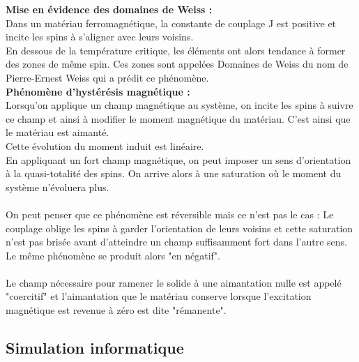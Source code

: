\textbf{Mise en évidence des domaines de Weiss :}\\
Dans un matériau ferromagnétique, la constante de couplage J est positive et incite les spins à s'aligner avec leurs voisins.\\
En dessous de la température critique, les éléments ont alors tendance à former des zones de même spin. Ces zones sont appelées Domaines de Weiss du nom de Pierre-Ernest Weiss qui a prédit ce phénomène.\\


\textbf{Phénomène d'hystérésis magnétique :}\\
Lorsqu'on applique un champ magnétique au système, on incite les spins à suivre ce champ et ainsi à modifier le moment magnétique du matériau. C'est ainsi que le matériau est aimanté.\\
Cette évolution du moment induit est linéaire.\\
En appliquant un fort champ magnétique, on peut imposer un sens d'orientation à la quasi-totalité des spins. On arrive alors à une saturation où le moment du système n'évoluera plus.\\
\\
On peut penser que ce phénomène est réversible mais ce n'est pas le cas : Le couplage oblige les spins à garder l'orientation de leurs voisins et cette saturation n'est pas brisée avant d'atteindre un champ suffisamment fort dans l'autre sens. Le même phénomène se produit alors "en négatif".\\
\\
Le champ nécessaire pour ramener le solide à une aimantation nulle est appelé "coercitif" et l'aimantation que le matériau conserve lorsque l'excitation magnétique est revenue à zéro est dite "rémanente".\\

\vspace{\parskip} %

\subsection{Simulation informatique}

